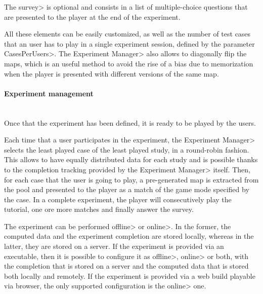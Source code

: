 The \<survey> is optional and consists in a list of multiple-choice questions that are presented to the player at the end of the experiment.

\par

All these elements can be easily customized, as well as the number of test cases that an user has to play in a single experiment session, defined by the parameter \<CasesPerUsers>. The \<Experiment Manager> also allows to diagonally flip the maps, which is an useful method to avoid the rise of a bias due to memorization when the player is presented with different versions of the same map.

\paragraph{Experiment management}

\mbox{}\\

{\setlength{\parindent}{0cm}
Once that the experiment has been defined, it is ready to be played  by the users.}

\par

Each time that a user participates in the experiment, the \<Experiment Manager> selects the least played case of the least played study, in a round-robin fashion. This allows to have equally distributed data for each study and is possible thanks to the completion tracking provided by the \<Experiment Manager> itself. Then, for each case that the user is going to play, a pre-generated map is extracted from the pool and presented to the player as a match of the game mode specified by the case. In a complete experiment, the player will consecutively play the tutorial, one ore more matches and finally answer the survey.

\par

The experiment can be performed \<offline> or \<online>. In the former, the computed data and the experiment completion are stored locally, whereas in the latter, they are stored on a server. If the experiment is provided via an executable, then it is possible to configure it as \<offline>, \<online> or both, with the completion that is stored on a server and the computed data that is stored both locally and remotely. If the experiment is provided via a web build playable via browser, the only supported configuration is the \<online> one. 

